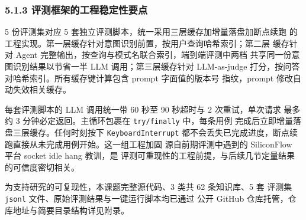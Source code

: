 \subsubsection*{5.1.3 \quad 评测框架的工程稳定性要点}

5 份评测集对应 5 套独立评测脚本，统一采用三层缓存加增量落盘加断点续跑
的工程实现。第一层缓存针对意图识别前置，按用户查询哈希索引；第二层
缓存针对 Agent 完整输出，按查询与模式名联合索引，端到端评测中两档
共享同一份意图识别结果以节省一半 LLM 调用；第三层缓存针对 LLM-as-judge
打分，按问答对哈希索引。所有缓存键计算包含 prompt 字面值的版本号
指纹，prompt 修改自动失效相关缓存。

每套评测脚本的 LLM 调用统一带 60 秒至 90 秒超时与 2 次重试，单次请求
最多约 3 分钟必定返回。主循环包裹在 \texttt{try/finally} 中，每条用例
完成后立即增量落盘三层缓存。任何时刻按下 \texttt{KeyboardInterrupt}
都不会丢失已完成进度，断点续跑直接从未完成用例开始。这一组工程加固
源自前期评测中遇到的 SiliconFlow 平台 socket idle hang 教训，是
评测可重现性的工程前提，与后续几节定量结果的可信度密切相关。

为支持研究的可复现性，本课题完整源代码、3 类共 62 条知识库、5 套
评测集 \texttt{jsonl} 文件、原始评测结果与一键运行脚本均已通过
公开 GitHub 仓库托管，仓库地址与简要目录结构详见附录。

